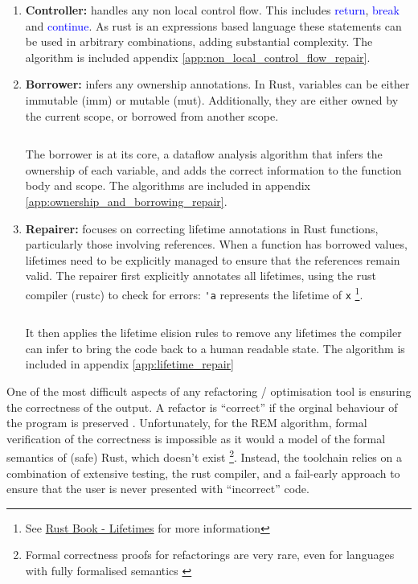 \begin{enumerate}
    \item \textbf{Controller:} handles any non local control flow. This includes
    \textcolor{blue}{return}, \textcolor{blue}{break} and
    \textcolor{blue}{continue}. As rust is an expressions based language
    \cite{rbooka} these statements can be used in arbitrary
    combinations, adding substantial complexity. The algorithm is included appendix
    \ref{app:non_local_control_flow_repair}.
    \item \textbf{Borrower:} infers any ownership annotations. In Rust,
    variables can be either immutable (imm) or mutable (mut). Additionally, they
    are either owned by the current scope, or borrowed from another scope.
    \inputminted[linenos, tabsize=2]{rust}{snippets/borrow.rs}
    The borrower is at its core, a dataflow analysis algorithm that infers the ownership of each
    variable, and adds the correct information to the function body and scope.
    The algorithms are included in appendix \ref{app:ownership_and_borrowing_repair}.
    \item \textbf{Repairer:} focuses on correcting lifetime annotations in Rust
    functions, particularly those involving references. When a function has
    borrowed values, lifetimes need to be explicitly managed to ensure that the
    references remain valid. The repairer first explicitly annotates all
    lifetimes, using the rust compiler (rustc) to check for errors: \verb|'a|
    represents the lifetime of \verb|x| \footnote{See
    \href{https://doc.rust-lang.org/nomicon/lifetimes.html}{Rust Book - Lifetimes} for more information}.
    \inputminted[]{rust}{snippets/lifetime.rs}
    It then applies the lifetime elision rules \cite{rbookb} to remove any
    lifetimes the compiler can infer to bring the code back to a human readable
    state.
    The algorithm is included in appendix \ref{app:lifetime_repair}
\end{enumerate}

One of the most difficult aspects of any refactoring / optimisation tool is
ensuring the correctness of the output. A refactor is ``correct'' if the orginal
behaviour of the program is preserved \cite{ProvingCompilerOptimisations}.
Unfortunately, for the REM algorithm, formal verification of the correctness is
impossible as it would a model of the formal semantics of (safe) Rust, which
doesn't exist \footnote{Formal correctness proofs for refactorings are very
rare, even for languages with fully formalised semantics
\cite{AdventureOfALifetime}}. Instead, the toolchain relies on a combination of
extensive testing, the rust compiler, and a fail-early approach to ensure that
the user is never presented with ``incorrect'' code.

